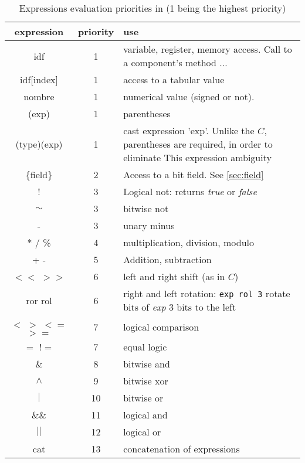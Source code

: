 \begin{table}[!h]
\begin{center}
\begin{tabularx}{\columnwidth}{|c|c|X|}
\hline
\bf expression & \bf priority & \bf use  \\  \hline
idf & 1 & variable, register, memory access. Call to a component's method ... \\ \hline
idf[index] & 1 & access to a tabular value \\ \hline
nombre & 1 & numerical value (signed or not). \\ \hline
(exp) & 1 & parentheses\\ \hline
(type)(exp) & 1 & cast expression 'exp'. Unlike the $C$, parentheses are required, in order to eliminate This expression ambiguity \\ \hline
\{field\} & 2 & Access to a bit field. See \ref{sec:field} \\ \hline
 ! & 3 &  Logical not: returns \emph{true} or \emph{false} \\ \hline
$\sim$  & 3 & bitwise not \\ \hline
-  & 3 & unary minus \\ \hline
* / \%  & 4 & multiplication, division, modulo \\ \hline
+ -  & 5 & Addition, subtraction \\ \hline
$<<$ $>>$ & 6 & left and right shift (as in $C$)\\ \hline
ror rol & 6 & right and left rotation: \texttt{exp rol 3} rotate bits of \emph{exp} 3 bits to the left \\ \hline
$<$ $>$ $<=$ $>=$ & 7 & logical comparison \\ \hline
$=$ $!=$  & 7 & equal logic \\ \hline
$\&$  & 8 & bitwise and \\ \hline
$\wedge$  & 9 & bitwise xor \\ \hline
$|$   & 10 & bitwise or \\ \hline
$\&\&$  & 11 & logical and \\ \hline
$||$   & 12 & logical or \\ \hline
cat   & 13 & concatenation of expressions \\ \hline
\end{tabularx}
\caption{Expressions evaluation priorities in \harmless (1 being the highest priority)}
\label{tab:exp}
\end{center}
\end{table}

